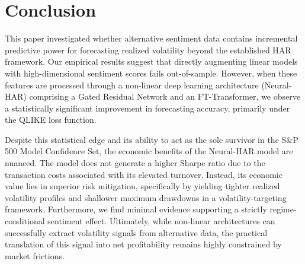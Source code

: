 \section{Conclusion}
\label{sec:conclusion}
This paper investigated whether alternative sentiment data contains incremental predictive power for forecasting realized volatility beyond the established HAR framework. Our empirical results suggest that directly augmenting linear models with high-dimensional sentiment scores fails out-of-sample. However, when these features are processed through a non-linear deep learning architecture (Neural-HAR) comprising a Gated Residual Network and an FT-Transformer, we observe a statistically significant improvement in forecasting accuracy, primarily under the QLIKE loss function. 

Despite this statistical edge and its ability to act as the sole survivor in the S\&P 500 Model Confidence Set, the economic benefits of the Neural-HAR model are nuanced. The model does not generate a higher Sharpe ratio due to the transaction costs associated with its elevated turnover. Instead, its economic value lies in superior risk mitigation, specifically by yielding tighter realized volatility profiles and shallower maximum drawdowns in a volatility-targeting framework. Furthermore, we find minimal evidence supporting a strictly regime-conditional sentiment effect. Ultimately, while non-linear architectures can successfully extract volatility signals from alternative data, the practical translation of this signal into net profitability remains highly constrained by market frictions.
